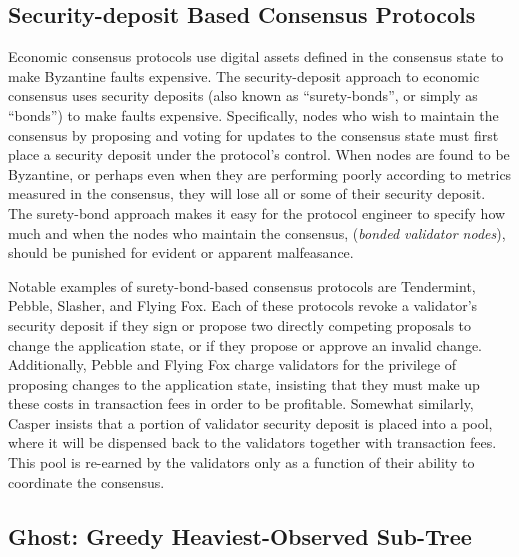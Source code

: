 \documentclass[11pt,a4paper]{article}
\begin{document}
\subsection{Security-deposit Based Consensus Protocols}

Economic consensus protocols use digital assets defined in the consensus state to make Byzantine faults expensive. The security-deposit approach to economic consensus uses security deposits (also known as ``surety-bonds'', or simply as ``bonds'') to make faults expensive. Specifically, nodes who wish to maintain the consensus by proposing and voting for updates to the consensus state must first place a security deposit under the protocol's control. When nodes are found to be Byzantine, or perhaps even when they are performing poorly according to metrics measured in the consensus, they will lose all or some of their security deposit. The surety-bond approach makes it easy for the protocol engineer to specify how much and when the nodes who maintain the consensus, (\emph{bonded validator nodes}), should be punished for evident or apparent malfeasance.

Notable examples of surety-bond-based consensus protocols are Tendermint\cite{TM}, Pebble\cite{Pebble}, Slasher\cite{Slasher}, and Flying Fox\cite{FlyingFox}. Each of these protocols revoke a validator's security deposit if they sign or propose two directly competing proposals to change the application state, or if they propose or approve an invalid change. Additionally, Pebble and Flying Fox charge validators for the privilege of proposing changes to the application state, insisting that they must make up these costs in transaction fees in order to be profitable. Somewhat similarly, Casper insists that a portion of validator security deposit is placed into a pool, where it will be dispensed back to the validators together with transaction fees. This pool is re-earned by the validators only as a function of their ability to coordinate the consensus. 


\subsection{Ghost: Greedy Heaviest-Observed Sub-Tree}
\end{document}
